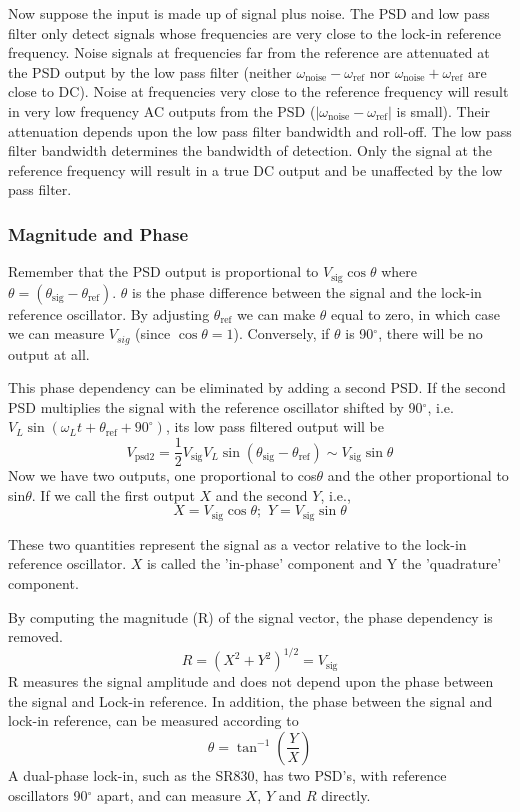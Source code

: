 \documentclass{../lab}
\begin{document}
Now suppose the input is made up of signal plus noise. The PSD and low pass filter only detect signals whose frequencies are very close to the lock-in reference frequency. Noise signals at frequencies far from the reference are attenuated at the PSD output by the low pass filter (neither $\omega_\text{noise} - \omega_\text{ref}$ nor $\omega_\text{noise} + \omega_\text{ref}$ are close to DC). Noise at frequencies very close to the reference frequency will result in very low frequency AC outputs from the PSD ($|\omega_\text{noise} - \omega_\text{ref}|$ is small). Their attenuation depends upon the low pass filter bandwidth and roll-off. The low pass filter bandwidth determines the bandwidth of detection. Only the signal at the reference frequency will result in a true DC output and be unaffected by the low pass filter. 


\subsubsection{Magnitude and Phase}

Remember that the PSD output is proportional to $V_\text{sig} \cos \theta$ where $\theta = (\theta_\text{sig} - \theta_\text{ref})$. $\theta$ is the phase difference between the signal and the lock-in reference oscillator. By adjusting $\theta_\text{ref}$ we can make $\theta$ equal to zero, in which case we can measure $V_{sig}$ (since $\cos \theta = 1$). Conversely, if $\theta$ is 90$^\circ$, there will be no output at all. 

This phase dependency can be eliminated by adding a second PSD. If the second PSD multiplies the signal with the reference oscillator shifted by 90$^\circ$, i.e. $V_L \sin(\omega_Lt + \theta_\text{ref} + 90^\circ)$, its low pass filtered output will be
\[
    V_\text{psd2} = \frac{1}{2} V_\text{sig} V_L \sin(\theta_\text{sig} - \theta_\text{ref}) \sim V_\text{sig} \sin \theta
\]
Now we have two outputs, one proportional to cos$\theta$ and the other proportional to sin$\theta$. If we call the first output $X$ and the second $Y$, i.e.,
\[
    X = V_\text{sig} \cos \theta;\,\, Y = V_\text{sig} \sin \theta
\]

These two quantities represent the signal as a vector relative to the lock-in reference oscillator. $X$ is called the 'in-phase' component and Y the 'quadrature' component. 

By computing the magnitude (R) of the signal vector, the phase dependency is removed.
\[
    R = (X^2 + Y^2)^{1/2} = V_\text{sig}
\]
R measures the signal amplitude and does not depend upon the phase between the signal and Lock-in reference. In addition, the phase between the signal and lock-in reference, can be measured according to
\[
    \theta = \tan^{-1} \left(\frac{Y}{X} \right)
\]
A dual-phase lock-in, such as the SR830, has two PSD's, with reference oscillators 90$^\circ$ apart, and can measure $X$, $Y$ and $R$ directly. 
\end{document}
